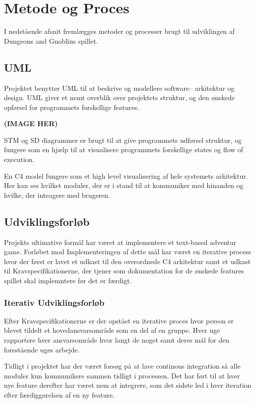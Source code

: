\section{Metode og Proces}
I nedstående afsnit fremlægges metoder og processer brugt 
til udviklingen af Dungeons and Gnoblins spillet. 

\subsection{UML}
Projektet benytter UML til at beskrive og modellere software-- arkitektur
og design. UML giver et nemt overblik over projektets struktur, og den 
ønskede opførsel for programmets forskellige features.

\textbf{(IMAGE HER)}

STM og SD diagrammer er brugt til at give programmets udførsel struktur, og fungere
som en hjælp til at visualisere programmets forskellige states og flow of execution.

En C4 model fungere som et high level visualisering af hele systemets arkitektur.
Her kan ses hvilket moduler, der er i stand til at kommuniker med hinanden og hvilke,
der inteagere med brugeren.

\subsection{Udviklingsforløb}
Projekts ultimative formål har været at implementere et text-based adventur game. 
Forløbet mod Implementeringen af dette mål har været en iterative process hvor 
der først er lavet et udkast til den overordnede C4 arkitektur samt et udkast
til Kravspecifikationerne, der tjener som dokumentation for de ønskede features 
spillet skal implemntere før det er færdigt.

\subsubsection{Iterativ Udviklingsforløb}

Efter Kravspecifikationerne er der opstået en iterative proces hvor person er
blevet tildelt et hovedansvarsområde som en del af en gruppe. Hver uge rapportere
hver ansvarsområde hvor langt de noget samt deres mål for den forestående uges arbejde.

Tidligt i projektet har der været forsøg på at lave continous integration så alle moduler
kun kommunikere sammen tidligt i processen. Det har ført til at hver nye feature derefter 
har været nem at integrere, som det sidste led i hver iteration efter færdiggørelsen af en
ny feature. 

